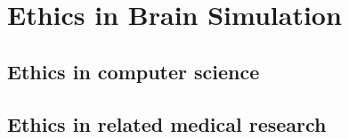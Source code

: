 \section{Ethics in Brain Simulation}

\subsection{Ethics in computer science}


\subsection{Ethics in related medical research}


